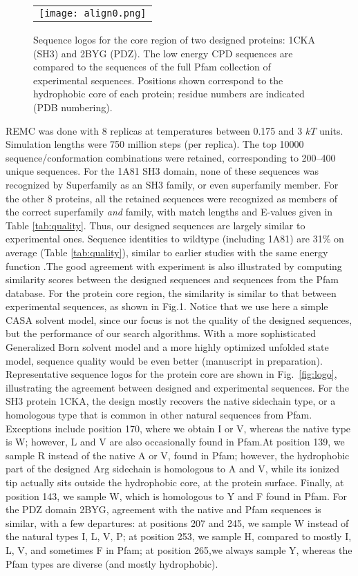     \begin{figure}[!htbp]
      \begin{tabular}{c}
        \texttt{[image: align0.png]} 
      \end{tabular}
      \caption[width=1cm]{\small 
Sequence logos for the core region of two designed proteins: 1CKA (SH3) and 2BYG (PDZ).
The low energy CPD sequences are compared to the sequences of the full Pfam collection of
experimental sequences. Positions shown correspond to the hydrophobic core of each
protein; residue numbers are indicated (PDB numbering).
}
      \label{fig:logos}
    \end{figure}



REMC was done with 8 replicas at temperatures between 0.175 and 3 $kT$
units. Simulation lengths were 750 million steps (per replica). The top 10000 sequence/conformation combinations were
retained, corresponding to 200--400 unique sequences. For the 1A81 SH3 domain, none of these sequences was recognized
by Superfamily as an SH3 family, or even superfamily member.
For the other 8 proteins, all the retained sequences were recognized as members of the correct superfamily {\it and}
family, with match lengths and E-values given in Table \ref{tab:quality}. Thus, our designed sequences are largely
similar to experimental ones. Sequence identities to wildtype (including 1A81) are 31\% on average (Table
\ref{tab:quality}), similar to earlier studies with the same energy function \cite{Schmidt09,Schmidt10}.The good
agreement with experiment is also illustrated by computing similarity scores between the
designed sequences and sequences from the Pfam database. For the protein core region, the similarity is similar to that between experimental sequences, as shown in Fig.1. Notice that we use here a simple CASA solvent model, since our focus is not the quality of the designed sequences, but the performance of our search algorithms. With a more
sophisticated Generalized Born solvent model and a more highly optimized unfolded state
model, sequence quality would be even better (manuscript in preparation).
Representative sequence logos for the protein core are shown in Fig.\ \ref{fig:logo}, illustrating the agreement
between designed and experimental sequences. For the SH3 protein 1CKA, the design mostly recovers the native sidechain type, or a homologous type that is common in other natural sequences from Pfam. Exceptions include position 170, where we obtain I or V, whereas the native type is W; however, L and V are also occasionally found in Pfam.At position 139, we sample R instead of the native A or V, found in Pfam; however, the hydrophobic part of the designed Arg sidechain is homologous to A and V, while its ionized tip actually sits outside the hydrophobic core, at the protein surface. Finally, at position 143, we sample W, which is homologous to Y and F found in Pfam. For the PDZ domain 2BYG, agreement with the native and Pfam sequences is similar, with a few departures: at positions 207 and 245, we sample W instead of the natural types I, L, V, P; at position 253, we sample H, compared to mostly I, L, V, and sometimes F in Pfam; at position 265,we always sample Y, whereas the Pfam types are diverse (and mostly hydrophobic).


